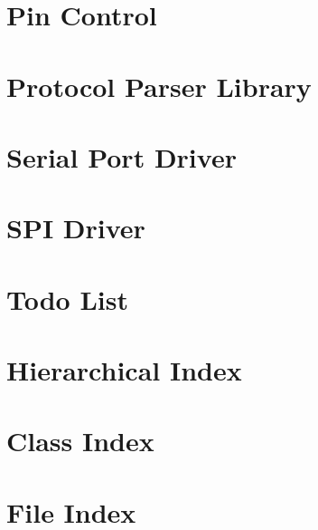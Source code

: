 \documentclass[twoside]{book}
\newcommand{\+}{\discretionary{\mbox{\scriptsize$\hookleftarrow$}}{}{}}
\begin{document}
\chapter{Pin Control}
\label{md_lib_pin_control__r_e_a_d_m_e}

\chapter{Protocol Parser Library}
\label{md_lib_protocol_parser__r_e_a_d_m_e}

\chapter{Serial Port Driver}
\label{md_lib_serial_port_driver__r_e_a_d_m_e}

\chapter{SPI Driver}
\label{md_lib_spi_driver__r_e_a_d_m_e}

\chapter{Todo List}
\label{todo}

\chapter{Hierarchical Index}

\chapter{Class Index}

\chapter{File Index}

\end{document}
